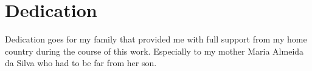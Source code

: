 \chapter*{Dedication}

Dedication goes for my family that provided me with full support from my home country during the course of this work. Especially to my mother Maria Almeida da Silva who had to be far from her son. 